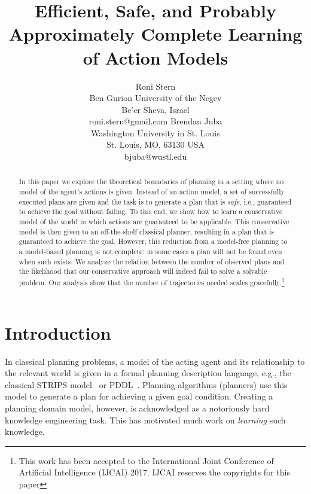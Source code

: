 \documentclass{article}
\title{Efficient, Safe, and Probably Approximately Complete Learning of Action Models}
\author{Roni Stern 
\\ Ben Gurion University of the Negev 
\\ Be'er Sheva, Israel
\\ roni.stern@gmail.com
\And Brendan Juba 
\\ Washington University in St. Louis
\\ St. Louis, MO, 63130 USA
\\ bjuba@wustl.edu
}
\begin{document}
	
	\maketitle
	
	\begin{abstract}
		In this paper we explore the theoretical boundaries of 
		planning in a setting where no model of the agent's actions is given. 
		Instead of an action model, a set of successfully executed plans are 
		given and the task is to generate a plan that is {\em safe}, i.e., guaranteed to achieve the goal without failing. 
		To this end, we show how to learn a conservative model of the world 
		in which actions are guaranteed to be applicable. 
		This conservative model is then given to an off-the-shelf classical planner, 
		resulting in a plan that is guaranteed to achieve the goal. 
		However, this reduction from a model-free planning to a 
		model-based planning is not complete: in some cases 
		a plan will not be found even when such exists. 
		We analyze the relation between the number of observed plans 
		and the likelihood that our conservative approach will indeed fail to solve a solvable problem. Our analysis show that the number of trajectories needed scales gracefully.\footnote{This work has been accepted to the International Joint Conference of Artificial Intelligence (IJCAI) 2017. IJCAI reserves the copyrights for this paper}
	\end{abstract}
	
	\section{Introduction}
	In classical planning problems, a model of the acting agent and its relationship to the relevant world is given in a formal planning description language, e.g., the classical STRIPS model~\cite{fikes1971strips} or PDDL~\cite{mcdermott1998pddl}. Planning algorithms (planners) use this model to generate a plan for achieving a given goal condition. 	
	Creating a planning domain model, however, is
	acknowledged as a notoriously hard knowledge engineering task.
	This has motivated much work on {\em learning} such knowledge.
	
\end{document}
